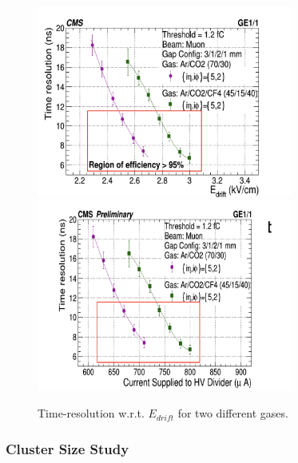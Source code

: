 \begin{figure}[!htbp]
\centering
\includegraphics[width=0.75\textwidth]{figures/GEM/TimeResolution_Edrift.jpeg}\\
\includegraphics[width=0.75\textwidth]{figures/GEM/TimeResolution_Current.jpeg}\\
\caption{Time-resolution w.r.t. $E_{drift}$ for two different gases.}
\label{TimeResolution}
\end{figure}



\subsubsection{Cluster Size Study}

